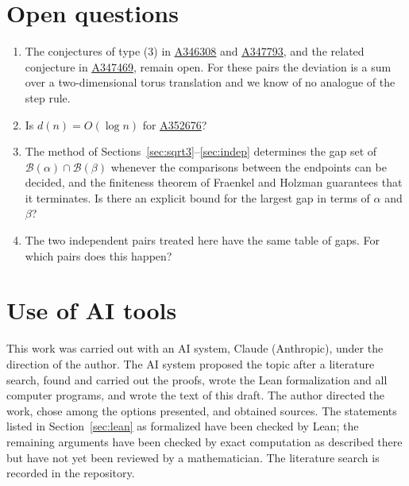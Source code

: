 \documentclass[12pt]{article}
\newcommand{\seqnum}[1]{\href{https://oeis.org/#1}{\underline{#1}}}
\newcommand{\B}{\mathcal{B}}
\theoremstyle{plain}
\theoremstyle{remark}
\begin{document}
\section{Open questions}\label{sec:open}

\begin{enumerate}
\item The conjectures of type (3) in \seqnum{A346308} and \seqnum{A347793}, and the related
conjecture in \seqnum{A347469}, remain open. For these pairs the deviation is a sum over a
two-dimensional torus translation and we know of no analogue of the step rule.
\item Is $d(n)=O(\log n)$ for \seqnum{A352676}?
\item The method of Sections~\ref{sec:sqrt3}--\ref{sec:indep} determines the gap set of
$\B(\alpha)\cap\B(\beta)$ whenever the comparisons between the endpoints can be decided, and
the finiteness theorem of Fraenkel and Holzman guarantees that it terminates. Is there an
explicit bound for the largest gap in terms of $\alpha$ and $\beta$?
\item The two independent pairs treated here have the same table of gaps. For which pairs does
this happen?
\end{enumerate}

\section{Use of AI tools}\label{sec:ai}

This work was carried out with an AI system, Claude (Anthropic), under the direction of the
author. The AI system proposed the topic after a literature search, found and carried out the
proofs, wrote the Lean formalization and all computer programs, and wrote the text of this
draft. The author directed the work, chose among the options presented, and obtained sources.
The statements listed in Section~\ref{sec:lean} as formalized have been checked by Lean; the
remaining arguments have been checked by exact computation as described there but have not yet
been reviewed by a mathematician. The literature search is recorded in the repository.
\end{document}
